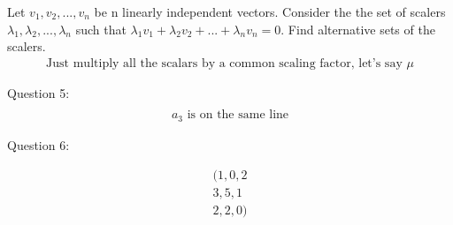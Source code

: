 \documentclass{article}
\begin{document}
Let $v_1, v_2, ..., v_n$ be n linearly independent vectors.
Consider the the set of scalers $\lambda_1, \lambda_2, ..., \lambda_n$ such that $\lambda_1 v_1 + \lambda_2 v_2 + ... + \lambda_n v_n = 0$.
Find alternative sets of the scalers.
\begin{align*}
    \textrm{Just multiply all the scalars by a common scaling factor, let's say } \mu
\end{align*}

Question 5:
\begin{align*}
    \textrm{} \\
    a_3 \textrm{ is on the same line}
\end{align*}

Question 6:

\begin{align}
(1, 0, 2 \\
3,5,1 \\
2,2,0) \\
\end{align}
\end{document}
